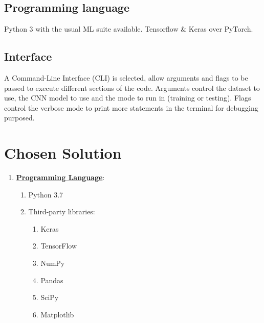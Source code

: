 \subsection{Programming language}

Python 3 with the usual ML suite available.
Tensorflow \& Keras over PyTorch. %

\subsection{Interface}

A Command-Line Interface (CLI) is selected, allow arguments and flags to be passed to execute different sections of the code. Arguments control the dataset to use, the CNN model to use and the mode to run in (training or testing). Flags control the verbose mode to print more statements in the terminal for debugging purposed.


\clearpage
\section{Chosen Solution}

\begin{enumerate}
    \item \underline{\textbf{Programming Language}}: 
    \begin{enumerate}
        \item Python 3.7
        \item Third-party libraries:
        \begin{enumerate}
        	\item Keras
        	\item TensorFlow
            \item NumPy
            \item Pandas
            \item SciPy
            \item Matplotlib
        \end{enumerate}
    \end{enumerate}
\end{enumerate}